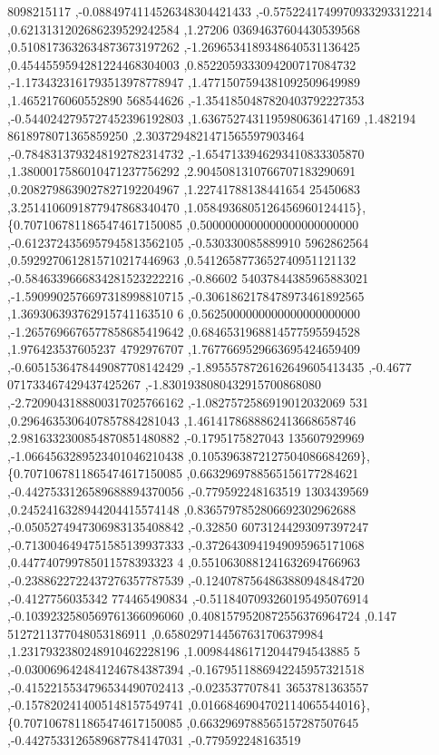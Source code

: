 \begin{DoxyCode}
      8098215117 ,-0.0884974114526348304421433 ,-0.5752241749970933293312214 ,0.6213131202686239529242584 ,1.27206
      03694637604430539568 ,0.5108173632634873673197262 ,-1.2696534189348640531136425 ,0.4544559594281224468304003
       ,0.8522059333094200717084732 ,-1.1734323161793513978778947 ,1.4771507594381092509649989 ,1.4652176060552890
      568544626 ,-1.3541850487820403792227353 ,-0.5440242795727452396192803 ,1.6367527431195980636147169 ,1.482194
      8618978071365859250 ,2.3037294821471565597903464 ,-0.7848313793248192782314732 ,-1.6547133946293410833305870
       ,1.3800017586010471237756292 ,2.9045081310766707183290691 ,0.2082798639027827192204967 ,1.22741788138441654
      25450683 ,3.2514106091877947868340470 ,1.0584936805126456960124415\},
\{0.7071067811865474617150085 ,0.5000000000000000000000000 ,-0.6123724356957945813562105 ,-0.530330085889910
      5962862564 ,0.5929270612815710217446963 ,0.5412658773652740951121132 ,-0.5846339666834281523222216 ,-0.86602
      54037844385965883021 ,-1.5909902576697318998810715 ,-0.3061862178478973461892565 ,1.369306393762915741163510
      6 ,0.5625000000000000000000000 ,-1.2657696676577858685419642 ,0.6846531968814577595594528 ,1.976423537605237
      4792976707 ,1.7677669529663695424659409 ,-0.6051536478449087708142429 ,-1.8955578726162649605413435 ,-0.4677
      071733467429437425267 ,-1.8301938080432915700868080 ,-2.7209043188800317025766162 ,-1.0827572586919012032069
      531 ,0.2964635306407857884281043 ,1.4614178688862413668658746 ,2.9816332300854870851480882 ,-0.1795175827043
      135607929969 ,-1.0664563289523401046210438 ,0.1053963872127504086684269\},
\{0.7071067811865474617150085 ,0.6632969788565156177284621 ,-0.4427533126589688894370056 ,-0.779592248163519
      1303439569 ,0.2452416328944204415574148 ,0.8365797852806692302962688 ,-0.0505274947306983135408842 ,-0.32850
      60731244293097397247 ,-0.7130046494751585139937333 ,-0.3726430941949095965171068 ,0.447740799785011578393323
      4 ,0.5510630881241632694766963 ,-0.2388622722437276357787539 ,-0.1240787564863880948484720 ,-0.4127756035342
      774465490834 ,-0.5118407093260195495076914 ,-0.1039232580569761366096060 ,0.4081579520872556376964724 ,0.147
      5127211377048053186911 ,0.6580297144567631706379984 ,1.2317932380248910462228196 ,1.009844861712044794543885
      5 ,-0.0300696424841246784387394 ,-0.1679511886942245957321518 ,-0.4152215534796534490702413 ,-0.023537707841
      3653781363557 ,-0.1578202414005148157549741 ,0.0166846904702114065544016\},
\{0.7071067811865474617150085 ,0.6632969788565157287507645 ,-0.4427533126589687784147031 ,-0.779592248163519

\end{DoxyCode}
